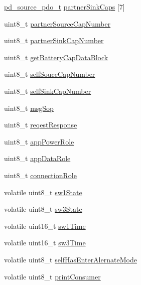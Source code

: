 \begin{DoxyCompactItemize}
\item 
\hyperlink{group__usb__pd__stack_gae3adfd5239231ab405b04bef0ae1df5a}{pd\-\_\-source\-\_\-pdo\-\_\-t} \hyperlink{struct__pd__app_acc42dfe2943d15788312733c25a20073}{partner\-Sink\-Caps} \mbox{[}7\mbox{]}
\item 
uint8\-\_\-t \hyperlink{struct__pd__app_a7cd2902dee071f9f64b078bd4ac955be}{partner\-Source\-Cap\-Number}
\item 
uint8\-\_\-t \hyperlink{struct__pd__app_a927a55034c0beae071c028b60cd36290}{partner\-Sink\-Cap\-Number}
\item 
uint8\-\_\-t \hyperlink{struct__pd__app_a19d055bbc32fed273953f9dc02346c94}{get\-Battery\-Cap\-Data\-Block}
\item 
uint8\-\_\-t \hyperlink{struct__pd__app_a7356b8ec554edd5c580b8b2310e3fed0}{self\-Souce\-Cap\-Number}
\item 
uint8\-\_\-t \hyperlink{struct__pd__app_a7d9aa4d298cbd3ac189473e46181d5bd}{self\-Sink\-Cap\-Number}
\item 
uint8\-\_\-t \hyperlink{struct__pd__app_a2fc0a3061498fda37106d3d16aec10c8}{msg\-Sop}
\item 
uint8\-\_\-t \hyperlink{struct__pd__app_a7020e18597a0914824f3b9cb417dff87}{reqest\-Response}
\item 
uint8\-\_\-t \hyperlink{struct__pd__app_ad2ef322a1e0c25a898d7aeef4242eae8}{app\-Power\-Role}
\item 
uint8\-\_\-t \hyperlink{struct__pd__app_a178e5ae073da9205e29d5b25fd47f0e0}{app\-Data\-Role}
\item 
uint8\-\_\-t \hyperlink{struct__pd__app_a537162ae6eb43697c212227ee7279208}{connection\-Role}
\item 
volatile uint8\-\_\-t \hyperlink{struct__pd__app_a86abcaa13a196038eec6f5eab97ab940}{sw1\-State}
\item 
volatile uint8\-\_\-t \hyperlink{struct__pd__app_a43c11ce854eb3293efaf0f274421a675}{sw3\-State}
\item 
volatile uint16\-\_\-t \hyperlink{struct__pd__app_a494ab24cc582fc7368f16a047a21a9fe}{sw1\-Time}
\item 
volatile uint16\-\_\-t \hyperlink{struct__pd__app_a61108d939110e1c95e4dd8cb001a5559}{sw3\-Time}
\item 
volatile uint8\-\_\-t \hyperlink{struct__pd__app_a6cd3330740f3a7d5c35f3c9edf8ec6e2}{self\-Has\-Enter\-Alernate\-Mode}
\item 
volatile uint8\-\_\-t \hyperlink{struct__pd__app_aab6771fc259fceda49fd93d3971c8f77}{print\-Consumer}
\item 

\end{DoxyCompactItemize}
